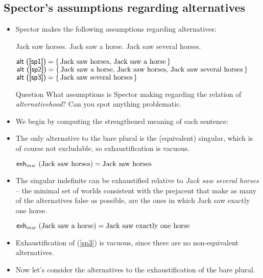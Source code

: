 \documentclass[landscape,twocolumn,cronos,paper=letter]{ling-handout}
\begin{document}
 \subsection{Spector's assumptions regarding alternatives}

 \begin{itemize}

   \item Spector makes the following assumptions regarding alternatives:

     \pex
     \a\label{sp1}Jack saw horses.
     \a\label{sp2}Jack saw a horse.
     \a\label{sp3}Jack saw several horses.
     \xe

     \pex
     \a \(\textsf{alt (\ref{sp1})} = \set{\text{Jack saw horses, Jack saw a horse}}\)
     \a \(\textsf{alt (\ref{sp2})} = \set{\text{Jack saw a horse, Jack saw horses,
     Jack saw several horses}}\)
     \a \(\textsf{alt (\ref{sp3})} = \set{\text{Jack saw several horses}}\)
     \xe

     \begin{tcolorbox}
       Question
       \tcblower
       What assumptions is Spector making regarding the relation of
       \textit{alternativehood}? Can you spot anything problematic.
     \end{tcolorbox}

   \item We begin by computing the strengthened meaning of each sentence:

     \item The only alternative to the bare plural is the (equivalent) singular,
     which is of course not excludable, so exhaustification is vacuous.

     \ex
     \(\ml{exh}_{mw} (\text{Jack saw horses}) = \text{Jack saw horses}\)
     \xe

     \item The singular indefinite can be exhaustified relative to \textit{Jack
     saw several horses} -- the minimal set of worlds consistent with the
     prejacent that make as many of the alternatives false as possible, are the
     ones in which Jack saw exactly one horse.

     \ex
     \(\ml{exh}_{mw} (\text{Jack saw a horse}) = \text{Jack saw exactly one horse}\)
     \xe

     \item Exhaustification of (\ref{sp3}) is vacuous, since there are no
     non-equivalent alternatives.

     \item Now let's consider the alternatives to the exhaustification of the
     bare plural.


\end{itemize}
\end{document}
